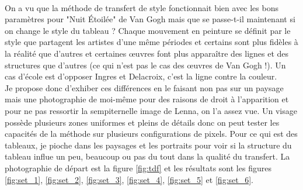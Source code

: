 \documentclass{article}
\begin{document}
\paragraph*{}
On a vu que la méthode de transfert de style fonctionnait bien avec les bons paramètres pour "Nuit Étoilée" de Van Gogh mais que se passe-t-il maintenant si on change le style du tableau ? Chaque mouvement en peinture se définit par le style que partagent les artistes d'une même périodes et certains sont plus fidèles à la réalité que d'autres et certaines œuvres font plus apparaître des lignes et des structures que d'autres (ce qui n'est pas le cas des œuvres de Van Gogh !). Un cas d'école est d'opposer Ingres et Delacroix, c'est la ligne contre la couleur.\\
Je propose donc d'exhiber ces différences en le faisant non pas sur un paysage mais une photographie de moi-même pour des raisons de droit à l'apparition et pour ne pas ressortir la sempiternelle image de Lenna, on l'a assez vue. Un visage possède plusieurs zones uniformes et pleins de détails donc on peut tester les capacités de la méthode sur plusieurs configurations de pixels. Pour ce qui est des tableaux, je pioche dans les paysages et les portraits pour voir si la structure du tableau influe un peu, beaucoup ou pas du tout dans la qualité du transfert. La photographie de départ est la figure \ref{fig:tdf} et les résultats sont les figures \ref{fig:set_1}, \ref{fig:set_2}, \ref{fig:set_3}, \ref{fig:set_4}, \ref{fig:set_5} et \ref{fig:set_6}.
\end{document}
